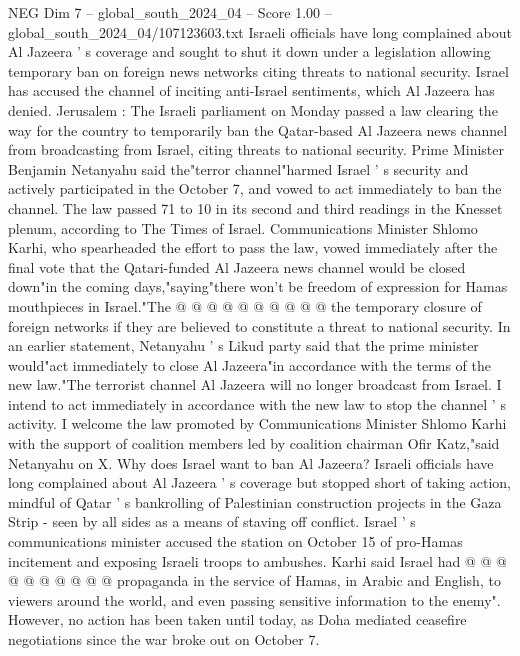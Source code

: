 \begin{textsample}{NEG Dim 7 – global\_south\_2024\_04 – Score 1.00 – global\_south\_2024\_04/107123603.txt}  \label{ex:f7_neg_283}
Israeli officials have long complained about Al Jazeera ' s coverage and sought to shut it down under a legislation allowing temporary ban on foreign news networks citing threats to national security.
Israel has accused the channel of inciting anti-Israel sentiments, which Al Jazeera has denied.
Jerusalem : The Israeli parliament on Monday passed a law clearing the way for the country to temporarily ban the Qatar-based Al Jazeera news channel from broadcasting from Israel, citing threats to national security.
Prime Minister Benjamin Netanyahu said the"terror channel"harmed Israel ' s security and actively participated in the October 7, and vowed to act immediately to ban the channel.
The law passed 71 to 10 in its second and third readings in the Knesset plenum, according to The Times of Israel.
Communications Minister Shlomo Karhi, who spearheaded the effort to pass the law, vowed immediately after the final vote that the Qatari-funded Al Jazeera news channel would be closed down"in the coming days,"saying"there won't be freedom of expression for Hamas mouthpieces in Israel."The @ @ @ @ @ @ @ @ @ @ the temporary closure of foreign networks if they are believed to constitute a threat to national security.
In an earlier statement, Netanyahu ' s Likud party said that the prime minister would"act immediately to close Al Jazeera"in accordance with the terms of the new law."The terrorist channel Al Jazeera will no longer broadcast from Israel.
I intend to act immediately in accordance with the new law to stop the channel ' s activity.
I welcome the law promoted by Communications Minister Shlomo Karhi with the support of coalition members led by coalition chairman Ofir Katz,"said Netanyahu on X.
Why does Israel want to ban Al Jazeera?
Israeli officials have long complained about Al Jazeera ' s coverage but stopped short of taking action, mindful of Qatar ' s bankrolling of Palestinian construction projects in the Gaza Strip - seen by all sides as a means of staving off conflict.
Israel ' s communications minister accused the station on October 15 of pro-Hamas incitement and exposing Israeli troops to ambushes.
Karhi said Israel had @ @ @ @ @ @ @ @ @ @ propaganda in the service of Hamas, in Arabic and English, to viewers around the world, and even passing sensitive information to the enemy".
However, no action has been taken until today, as Doha mediated ceasefire negotiations since the war broke out on October 7.

\end{textsample}
